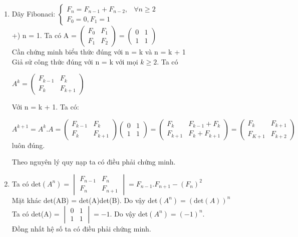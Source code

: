 \documentclass[12pt,oneside]{book}
\begin{document}
\begin{enumerate}[label = \alph*)]
	\item 
	Dãy Fibonaci:
	$\begin{cases}
		F_n = F_{n-1}+F_{n-2},& \forall n \geq 2\\
		F_0 = 0, F_1 = 1
	\end{cases}$\\
	+) n = 1. Ta có A = 
	$\begin{pmatrix}
		F_0 & F_1 \\
		F_1 & F_2 
	\end{pmatrix}=\begin{pmatrix}
		0 & 1\\ 1 & 1
	\end{pmatrix}$\\
	Cần chứng minh biểu thức đúng với n = k và n = k + 1\\
	Giả sử công thức đúng với n = k với mọi $k\geq 2$. Ta có
	\begin{center}
		$A^k = \begin{pmatrix}
			F_{k-1} & F_k\\
			F_k & F_{k+1}
		\end{pmatrix}$
	\end{center}
	Với n = k + 1.
	Ta có:\\
	\begin{center}
		$A^{k+1} = A^k.A  = \begin{pmatrix}
			F_{k-1} & F_{k}\\
			F_k & F_{k+1}
		\end{pmatrix}
		\begin{pmatrix}
			0 & 1 \\ 1 & 1
		\end{pmatrix} = \begin{pmatrix}
			F_k & F_{k-1}+F_k\\
			F_{k+1}& F_k + F_{k+1}
		\end{pmatrix}= \begin{pmatrix}
			F_k & F_{k+1}\\
			F_{K+1} & F_{k+2}
		\end{pmatrix}$ luôn đúng.
	\end{center}
	Theo nguyên lý quy nạp ta có điều phải chứng minh.
	\item 
	Ta có det$(A^n)= \begin{vmatrix}
		F_{n-1} &F_n\\
		F_n & F_{n+1}
	\end{vmatrix}= F_{n-1}.F_{n+1}-(F_n)^2$\\
	Mặt khác det(AB) = det(A)det(B). Do vậy det$(A^n) = (\text{det$(A)$})^n$\\
	Ta có det(A) = $\begin{vmatrix}
		0 &1 \\ 1&1
	\end{vmatrix}= -1$. Do vậy det$(A^n)= (-1)^n$.
	\\Đồng nhất hệ số ta có điều phải chứng minh.
\end{enumerate}
\end{document}
